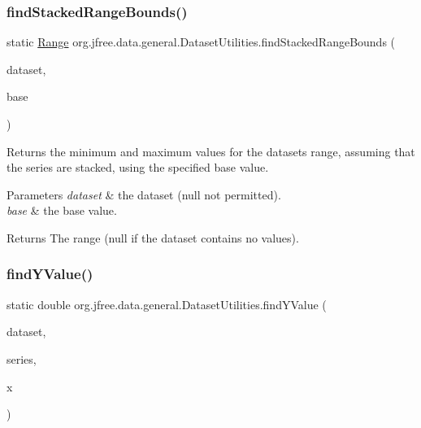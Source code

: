 \subsubsection{\texorpdfstring{find\+Stacked\+Range\+Bounds()}{findStackedRangeBounds()}\hspace{0.1cm}{\footnotesize\ttfamily [5/5]}}
{\footnotesize\ttfamily static \mbox{\hyperlink{classorg_1_1jfree_1_1data_1_1_range}{Range}} org.\+jfree.\+data.\+general.\+Dataset\+Utilities.\+find\+Stacked\+Range\+Bounds (\begin{DoxyParamCaption}\item[{\mbox{\hyperlink{interfaceorg_1_1jfree_1_1data_1_1xy_1_1_table_x_y_dataset}{Table\+X\+Y\+Dataset}}}]{dataset,  }\item[{double}]{base }\end{DoxyParamCaption})\hspace{0.3cm}{\ttfamily [static]}}

Returns the minimum and maximum values for the dataset\textquotesingle{}s range, assuming that the series are stacked, using the specified base value.


\begin{DoxyParams}{Parameters}
{\em dataset} & the dataset ({\ttfamily null} not permitted). \\
\hline
{\em base} & the base value.\\
\hline
\end{DoxyParams}
\begin{DoxyReturn}{Returns}
The range ({\ttfamily null} if the dataset contains no values). 
\end{DoxyReturn}
\mbox{\label{classorg_1_1jfree_1_1data_1_1general_1_1_dataset_utilities_ae29a90bb6a00a0c36ccfc5d7e57c1c24}} 
\subsubsection{\texorpdfstring{find\+Y\+Value()}{findYValue()}}
{\footnotesize\ttfamily static double org.\+jfree.\+data.\+general.\+Dataset\+Utilities.\+find\+Y\+Value (\begin{DoxyParamCaption}\item[{\mbox{\hyperlink{interfaceorg_1_1jfree_1_1data_1_1xy_1_1_x_y_dataset}{X\+Y\+Dataset}}}]{dataset,  }\item[{int}]{series,  }\item[{double}]{x }\end{DoxyParamCaption})\hspace{0.3cm}{\ttfamily [static]}}

